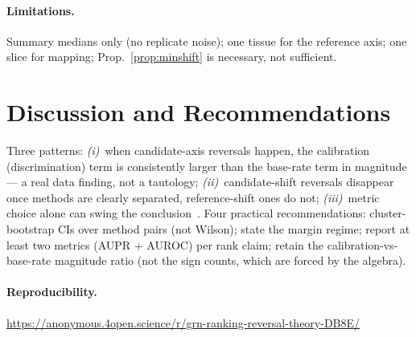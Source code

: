 \documentclass[sigconf,anonymous]{acmart}
\begin{document}
\paragraph{Limitations.} Summary medians only (no replicate noise); one
tissue for the reference axis; one slice for mapping;
Prop.~\ref{prop:minshift} is necessary, not sufficient.

\section{Discussion and Recommendations}
\label{sec:discussion}

Three patterns: \emph{(i)}~when candidate-axis reversals happen, the
calibration (discrimination) term is consistently larger than the
base-rate term in magnitude --- a real data finding, not a tautology;
\emph{(ii)}~candidate-shift reversals disappear once methods are clearly
separated, reference-shift ones do not; \emph{(iii)}~metric choice
alone can swing the conclusion~\cite{demsar2006}. Four practical
recommendations: cluster-bootstrap CIs over method pairs (not Wilson);
state the margin regime; report at least two metrics (AUPR + AUROC) per
rank claim; retain the calibration-vs-base-rate magnitude ratio (not the
sign counts, which are forced by the algebra).

\paragraph{Reproducibility.}
\url{https://anonymous.4open.science/r/grn-ranking-reversal-theory-DB8E/}
\end{document}
